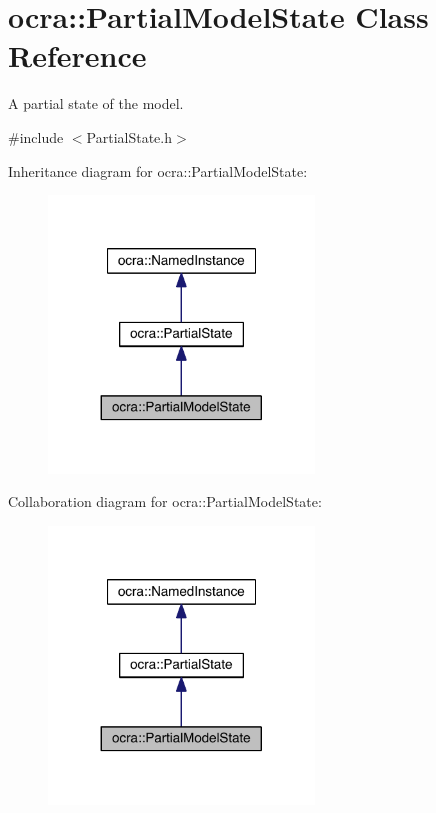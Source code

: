 \hypertarget{classocra_1_1PartialModelState}{}\section{ocra\+:\+:Partial\+Model\+State Class Reference}
\label{classocra_1_1PartialModelState}


A partial state of the model.  




{\ttfamily \#include $<$Partial\+State.\+h$>$}



Inheritance diagram for ocra\+:\+:Partial\+Model\+State\+:\nopagebreak
\begin{figure}[H]
\begin{center}
\leavevmode
\includegraphics[width=200pt]{db/dff/classocra_1_1PartialModelState__inherit__graph}
\end{center}
\end{figure}


Collaboration diagram for ocra\+:\+:Partial\+Model\+State\+:\nopagebreak
\begin{figure}[H]
\begin{center}
\leavevmode
\includegraphics[width=200pt]{d8/d23/classocra_1_1PartialModelState__coll__graph}
\end{center}
\end{figure}
